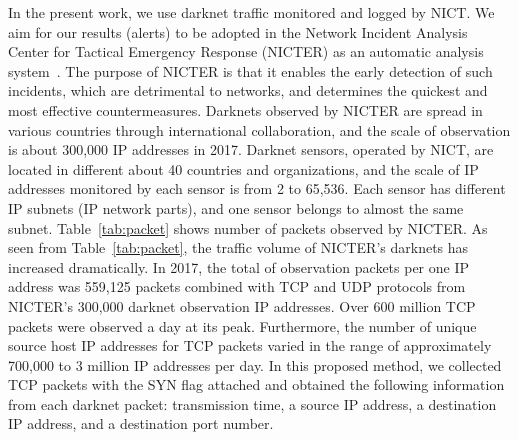\documentclass[letterpaper]{sig-alternate-10pt}
\begin{document}
In the present work, we use darknet traffic monitored and logged by NICT.
We aim for our results (alerts) to be adopted in the Network Incident Analysis Center for Tactical Emergency Response (NICTER) as an automatic analysis system~\cite{NICTERWEB, Nakao}.
The purpose of NICTER is that it enables the early detection of such incidents, which are detrimental to networks, and determines the quickest and most effective countermeasures.
Darknets observed by NICTER are spread in various countries through international collaboration, and the scale of observation is about 300,000 IP addresses in 2017.
Darknet sensors, operated by NICT, are located in different about 40 countries and organizations, and the scale of IP addresses monitored by each sensor is from 2 to 65,536.
Each sensor has different IP subnets (IP network parts), and one sensor belongs to almost the same subnet.
Table~\ref{tab:packet} shows number of packets observed by NICTER.
As seen from Table~\ref{tab:packet}, the traffic volume of NICTER's darknets has increased dramatically.
In 2017, the total of observation packets per one IP address was 559,125 packets combined with TCP and UDP protocols from NICTER's 300,000 darknet observation IP addresses.
Over 600 million TCP packets were observed a day at its peak.
Furthermore, the number of unique source host IP addresses for TCP packets varied in the range of approximately 700,000 to 3 million IP addresses per day.
In this proposed method, we collected TCP packets with the SYN flag attached and obtained the following information from each darknet packet: transmission time, a source IP address, a destination IP address, and a destination port number.
\end{document}
